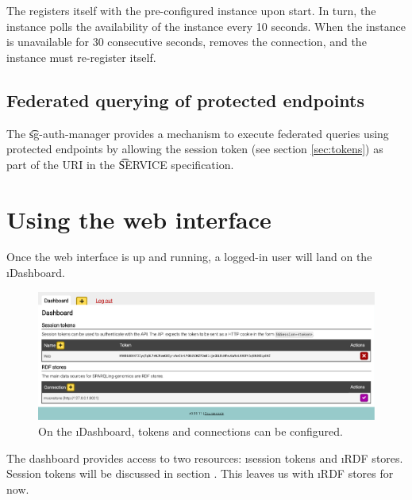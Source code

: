   The  registers itself with the pre-configured
   instance upon start.  In turn, the  instance
  polls the availability of the  instance every 10
  seconds.  When the  instance is unavailable for 30
  consecutive seconds,  removes the connection, and the
   instance must re-register itself.

\subsection{Federated querying of protected endpoints}

  The \t{sg-auth-manager} provides a mechanism to execute federated queries
  using protected endpoints by allowing the session token (see section
  \ref{sec:tokens}) as part of the URI in the \t{SERVICE} specification.

\section{Using the web interface}
\label{sec:using-web-interface}

  Once the web interface is up and running, a logged-in user will land
  on the \i{Dashboard}.

  \begin{figure}[H]
    \begin{center}
      \includegraphics[width=1.0\textwidth]{figures/sg-web-dashboard.pdf}
    \end{center}
    \caption{On the \i{Dashboard}, tokens and connections can be
      configured.}
    \label{fig:web-dashboard}
  \end{figure}

  The dashboard provides access to two resources: \i{session tokens}
  and \i{RDF stores}.  Session tokens will be discussed in section
  .  This leaves us with \i{RDF stores} for now.


